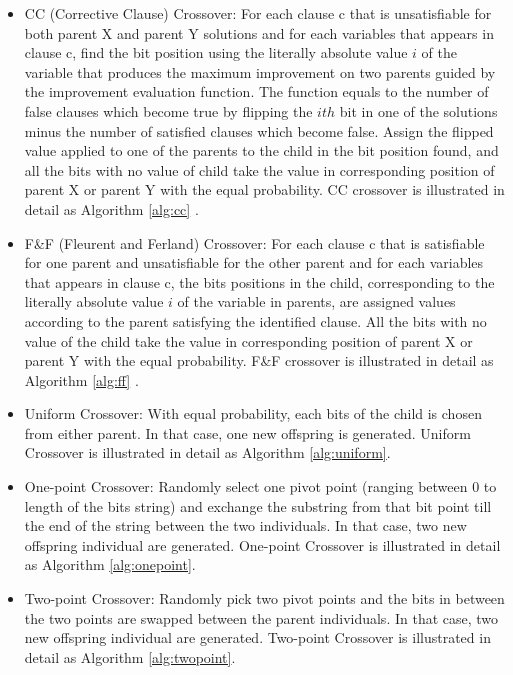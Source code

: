 	\begin{itemize}
		\item
		      CC (Corrective Clause) Crossover: For each clause c that is unsatisfiable for
		      both parent X and parent Y solutions and for each variables that appears in
		      clause c, find the bit position using the literally absolute value
		      $i$ of the variable that produces the maximum improvement on
		      two parents guided by the improvement evaluation function. The function equals
		      to the number of false clauses which become true by flipping the
		      $ith$ bit in one of the solutions minus the number of
		      satisfied clauses which become false. Assign the flipped value applied to one
		      of the parents to the child in the bit position found, and all the bits with
		      no value of child take the value in corresponding position of parent X or
		      parent Y with the equal probability. CC crossover is illustrated in detail as Algorithm \ref{alg:cc} \parencite{lardeux2006gasat}.
			
		\item
		      F\&F (Fleurent and Ferland) Crossover: For each clause c that is satisfiable
		      for one parent and unsatisfiable for the other parent and for each variables
		      that appears in clause c, the bits positions in the child, corresponding to
		      the literally absolute value $i$ of the variable in parents,
		      are assigned values according to the parent satisfying the identified clause.
		      All the bits with no value of the child take the value in corresponding
		      position of parent X or parent Y with the equal probability. F\&F crossover is illustrated in detail as Algorithm \ref{alg:ff} \parencite{lardeux2006gasat}.
			  
		\item
		      Uniform Crossover: With equal probability, each bits of the child is chosen
		      from either parent. In that case, one new offspring is generated. Uniform Crossover is illustrated in detail as Algorithm \ref{alg:uniform}.
			  
		\item One-point Crossover: Randomly select one pivot point (ranging between 0 to
		      length of the bits string) and exchange the substring from that bit point till
		      the end of the string between the two individuals. In that case, two new
		      offspring individual are generated. One-point Crossover is illustrated in detail as Algorithm \ref{alg:onepoint}.
		\item
		      Two-point Crossover: Randomly pick two pivot points and the bits in between
		      the two points are swapped between the parent individuals. In that case, two
		      new offspring individual are generated. Two-point Crossover is illustrated in detail as Algorithm \ref{alg:twopoint}.
			 
	\end{itemize}
